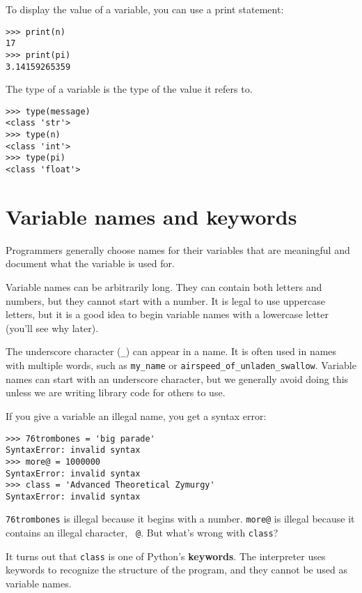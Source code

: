 To display the value of a variable, you can use a print statement:

\beforeverb
\begin{verbatim}
>>> print(n)
17
>>> print(pi)
3.14159265359
\end{verbatim}
\afterverb
%
The type of a variable is the type of the value it refers to.

\beforeverb
\begin{verbatim}
>>> type(message)
<class 'str'>
>>> type(n)
<class 'int'>
>>> type(pi)
<class 'float'>
\end{verbatim}
\afterverb
%

\section{Variable names and keywords}

Programmers generally choose names for their variables that
are meaningful and document what the variable is used for.

Variable names can be arbitrarily long.  They can contain
both letters and numbers, but they cannot start with a number.
It is legal to use uppercase letters, but it is a good idea
to begin variable names with a lowercase letter (you'll
see why later).

The underscore character (\verb"_") can appear in a name.
It is often used in names with multiple words, such as
\verb"my_name" or \verb"airspeed_of_unladen_swallow".
Variable names can start with an underscore character, but
we generally avoid doing this unless we are writing library 
code for others to use.


If you give a variable an illegal name, you get a syntax error:

\beforeverb
\begin{verbatim}
>>> 76trombones = 'big parade'
SyntaxError: invalid syntax
>>> more@ = 1000000
SyntaxError: invalid syntax
>>> class = 'Advanced Theoretical Zymurgy'
SyntaxError: invalid syntax
\end{verbatim}
\afterverb
%
{\tt 76trombones} is illegal because it begins with a number.
{\tt more@} is illegal because it contains an illegal character, {\tt
@}.  But what's wrong with {\tt class}?

It turns out that {\tt class} is one of Python's {\bf keywords}.  The
interpreter uses keywords to recognize the structure of the program,
and they cannot be used as variable names.


